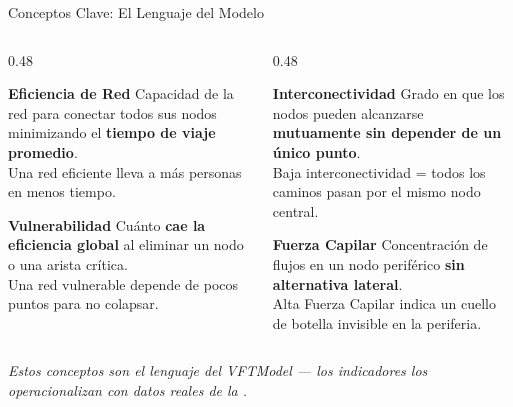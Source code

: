 \begin{frame}{Conceptos Clave: El Lenguaje del Modelo}
  \begin{columns}[T]
    \begin{column}{0.48\textwidth}
      \begin{block}{\scriptsize\bfseries Eficiencia de Red}
        {\scriptsize
          Capacidad de la red para conectar todos sus nodos
          minimizando el \textbf{tiempo de viaje promedio}.\\[0.08cm]
          Una red eficiente lleva a más personas en menos tiempo.}
      \end{block}
      \vspace{0.15cm}
      \begin{block}{\scriptsize\bfseries Vulnerabilidad}
        {\scriptsize
          Cuánto \textbf{cae la eficiencia global} al eliminar
          un nodo o una arista crítica.\\[0.08cm]
          Una red vulnerable depende de pocos puntos para no colapsar.}
      \end{block}
    \end{column}
    \begin{column}{0.48\textwidth}
      \begin{block}{\scriptsize\bfseries Interconectividad}
        {\scriptsize
          Grado en que los nodos pueden alcanzarse
          \textbf{mutuamente sin depender de un único punto}.\\[0.08cm]
          Baja interconectividad = todos los caminos pasan
          por el mismo nodo central.}
      \end{block}
      \vspace{0.15cm}
      \begin{block}{\scriptsize\bfseries Fuerza Capilar}
        {\scriptsize
          Concentración de flujos en un nodo periférico
          \textbf{sin alternativa lateral}.\\[0.08cm]
          Alta Fuerza Capilar indica un cuello de botella
          invisible en la periferia.}
      \end{block}
    \end{column}
  \end{columns}
  \vspace{0.1cm}
  {\scriptsize\itshape\color{ColorPrincipal}
    Estos conceptos son el lenguaje del VFTModel —
    los indicadores los operacionalizan con datos reales de la \zmvm{}.}
\end{frame}

